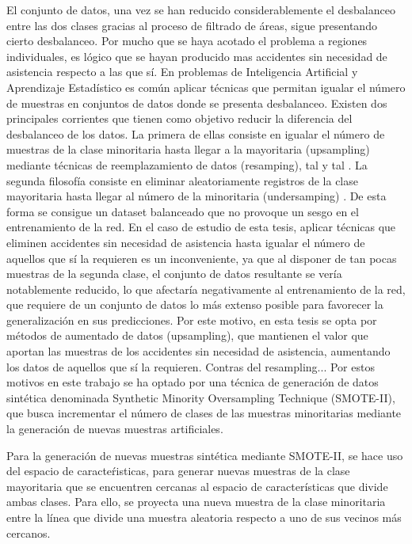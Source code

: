 \documentclass{uathesis-es}
\begin{document}
El conjunto de datos, una vez se han reducido considerablemente el desbalanceo entre las dos clases gracias al proceso de filtrado de áreas, sigue presentando cierto desbalanceo. Por mucho que se haya acotado el problema a regiones individuales, es lógico que se hayan producido mas accidentes sin necesidad de asistencia respecto a las que sí. En problemas de Inteligencia Artificial y Aprendizaje Estadístico es común aplicar técnicas que permitan igualar el número de muestras en conjuntos de datos donde se presenta desbalanceo. Existen dos principales corrientes que tienen como objetivo reducir la diferencia del desbalanceo de los datos. La primera de ellas consiste en igualar el número de muestras de la clase minoritaria hasta llegar a la mayoritaria (upsampling) mediante técnicas de reemplazamiento de datos (resamping), tal y tal . La segunda filosofía consiste en eliminar aleatoriamente registros de la clase mayoritaria hasta llegar al número de la minoritaria (undersamping) \cite{mohammed2020machine}. De esta forma se consigue un dataset balanceado que no provoque un sesgo en el entrenamiento de la red. En el caso de estudio de esta tesis, aplicar técnicas que eliminen accidentes sin necesidad de asistencia hasta igualar el número de aquellos que sí la requieren es un inconveniente, ya que al disponer de tan pocas muestras de la segunda clase, el conjunto de datos resultante se vería notablemente reducido, lo que afectaría negativamente al entrenamiento de la red, que requiere de un conjunto de datos lo más extenso posible para favorecer la generalización en sus predicciones. Por este motivo, en esta tesis se opta por métodos de aumentado de datos (upsampling), que mantienen el valor que aportan las muestras de los accidentes sin necesidad de asistencia, aumentando los datos de aquellos que sí la requieren. Contras del resampling... Por estos motivos en este trabajo se ha optado por una técnica de generación de datos sintética denominada Synthetic Minority Oversampling Technique (SMOTE-II), que busca incrementar el número de clases de las muestras minoritarias mediante la generación de nuevas muestras artificiales.

Para la generación de nuevas muestras sintética mediante SMOTE-II, se hace uso del espacio de caracteŕisticas, para generar nuevas muestras de la clase mayoritaria que se encuentren cercanas al espacio de características que divide ambas clases. Para ello, se proyecta una nueva muestra de la clase minoritaria entre la línea que divide una muestra aleatoria respecto a uno de sus vecinos más cercanos.
\end{document}
